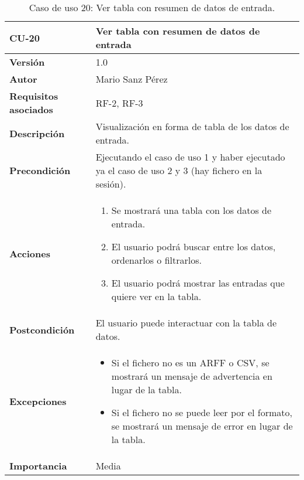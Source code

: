 \begin{table}[p]
	\centering
	\begin{tabularx}{\linewidth}{ p{} p{} }
		\toprule
		\textbf{CU-20}    & \textbf{Ver tabla con resumen de datos de entrada}\\
		\toprule
		\textbf{Versión}              & 1.0    \\
		\textbf{Autor}                & Mario Sanz Pérez \\
		\textbf{Requisitos asociados} & RF-2, RF-3 \\
		\textbf{Descripción}          & Visualización en forma de tabla de los datos de entrada. \\
		\textbf{Precondición}         & Ejecutando el caso de uso 1 y haber ejecutado ya el caso de uso 2 y 3 (hay fichero en la sesión). \\
		\textbf{Acciones}             &
		\begin{enumerate}
			\def\labelenumi{\arabic{enumi}.}
			\tightlist
			\item Se mostrará una tabla con los datos de entrada.
			\item El usuario podrá buscar entre los datos, ordenarlos o filtrarlos.
			\item El usuario podrá mostrar las entradas que quiere ver en la tabla.
		\end{enumerate}\\
		\textbf{Postcondición}        & El usuario puede interactuar con la tabla de datos. \\
		\textbf{Excepciones}          & \begin{itemize}
			\item Si el fichero no es un ARFF o CSV, se mostrará un mensaje de advertencia en lugar de la tabla.
			\item Si el fichero no se puede leer por el formato, se mostrará un mensaje de error en lugar de la tabla.
		\end{itemize} \\
		\textbf{Importancia}          & Media \\
		\bottomrule
	\end{tabularx}
	\caption[CU-20: Ver tabla con resumen de datos de entrada]{Caso de uso 20: Ver tabla con resumen de datos de entrada.}
\end{table}

